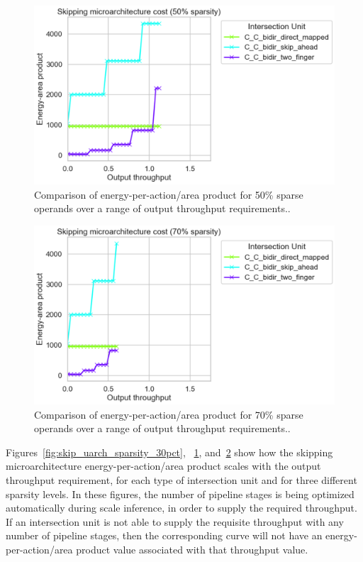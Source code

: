 \begin{figure}[H]
\includegraphics[width=\textwidth]{figures/skip_uarch_sparsity_50pct.png}
\caption{Comparison of energy-per-action/area product for 50\% sparse operands over a range of output throughput requirements..}
\label{fig:skip_uarch_sparsity_50pct}
\end{figure}

\begin{figure}[H]
\includegraphics[width=\textwidth]{figures/skip_uarch_sparsity_70pct.png}
\caption{Comparison of energy-per-action/area product for 70\% sparse operands over a range of output throughput requirements..}
\label{fig:skip_uarch_sparsity_70pct}
\end{figure}

Figures~\ref{fig:skip_uarch_sparsity_30pct}, 
~\ref{fig:skip_uarch_sparsity_50pct}, and~\ref{fig:skip_uarch_sparsity_70pct} show how the skipping microarchitecture energy-per-action/area product scales with the output throughput requirement, for each type of intersection unit and for three different sparsity levels. In these figures, the number of pipeline stages is being optimized automatically during scale inference, in order to supply the required throughput. If an intersection unit is not able to supply the requisite throughput with any number of pipeline stages, then the corresponding curve will not have an energy-per-action/area product value associated with that throughput value.

